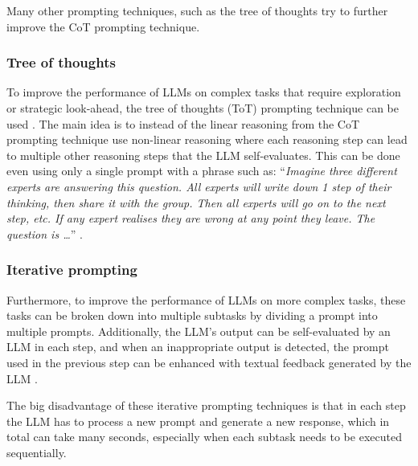 Many other prompting techniques, such as the tree of thoughts try to further improve the CoT prompting technique.


\subsubsection{Tree of thoughts}
\label{sec:tree_of_thoughts}

To improve the performance of LLMs on complex tasks that require exploration or strategic look-ahead, the tree of thoughts (ToT) prompting technique can be used \cite{Long2023, Yao2024}. The main idea is to instead of the linear reasoning from the CoT prompting technique use non-linear reasoning where each reasoning step can lead to multiple other reasoning steps that the LLM self-evaluates. This can be done even using only a single prompt with a phrase such as: ``\textit{Imagine three different experts are answering this question. All experts will write down 1 step of their thinking, then share it with the group. Then all experts will go on to the next step, etc. If any expert realises they are wrong at any point they leave. The question is \ldots}'' \cite{Hulbert2023}.


\subsubsection{Iterative prompting}
\label{sec:iterative_prompting}

Furthermore, to improve the performance of LLMs on more complex tasks, these tasks can be broken down into multiple subtasks by dividing a prompt into multiple prompts. Additionally, the LLM's output can be self-evaluated by an LLM in each step, and when an inappropriate output is detected, the prompt used in the previous step can be enhanced with textual feedback generated by the LLM \cite{Shinn2024}.

The big disadvantage of these iterative prompting techniques is that in each step the LLM has to process a new prompt and generate a new response, which in total can take many seconds, especially when each subtask needs to be executed sequentially.


